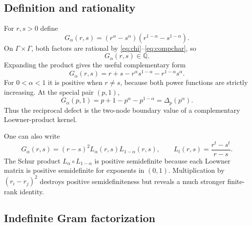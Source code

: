 \documentclass[11pt]{article}
\theoremstyle{definition}
\theoremstyle{remark}
\newcommand{\Q}{\mathbb{Q}}
\begin{document}
\subsection{Definition and rationality}

For $r,s>0$ define
\begin{equation}\label{eq:Gkernel}
 G_\alpha(r,s)
 =(r^\alpha-s^\alpha)(r^{1-\alpha}-s^{1-\alpha}).
\end{equation}
On $\Gamma\times\Gamma$, both factors are rational by \eqref{eq:chi}--\eqref{eq:compchar}, so
\begin{equation}\label{eq:G-rational}
 G_\alpha(r,s)\in\Q.
\end{equation}
Expanding the product gives the useful complementary form
\begin{equation}\label{eq:Gexpanded}
 G_\alpha(r,s)
 =r+s-r^\alpha s^{1-\alpha}-r^{1-\alpha}s^\alpha.
\end{equation}
For $0<\alpha<1$ it is positive when $r\ne s$, because both power functions are strictly increasing.  At the special pair $(p,1)$,
\begin{equation}\label{eq:GDelta}
 G_\alpha(p,1)=p+1-p^\alpha-p^{1-\alpha}
 =\Delta_p(p^\alpha).
\end{equation}
Thus the reciprocal defect is the two-node boundary value of a complementary Loewner-product kernel.

One can also write
\begin{equation}\label{eq:Loewner-product}
 G_\alpha(r,s)
 =(r-s)^2L_\alpha(r,s)L_{1-\alpha}(r,s),
 \qquad
 L_t(r,s)=\frac{r^t-s^t}{r-s}.
\end{equation}
The Schur product $L_\alpha\circ L_{1-\alpha}$ is positive semidefinite because each Loewner matrix is positive semidefinite for exponents in $(0,1)$.  Multiplication by $(r_i-r_j)^2$ destroys positive semidefiniteness but reveals a much stronger finite-rank identity.

\subsection{Indefinite Gram factorization}
\end{document}
